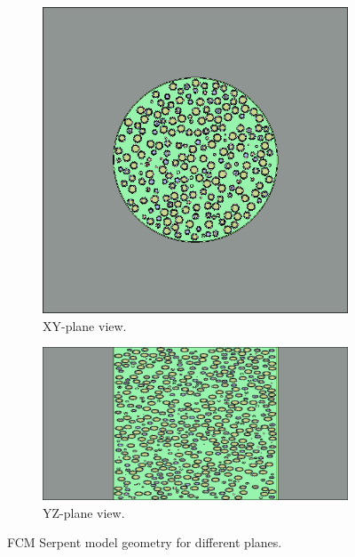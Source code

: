 \documentclass[11pt,letterpaper]{article}
\begin{document}
	\begin{figure}[htbp!]
		\centering
		\begin{subfigure}[t]{0.4\textwidth}
			\centering
			\includegraphics[width=\linewidth]{figures/FCM_geom1.png} 
			\caption{XY-plane view.}
			\label{fig:FCM_xy}
		\end{subfigure}
		\begin{subfigure}[t]{0.4\textwidth}
			\centering
			\includegraphics[width=\linewidth]{figures/FCM_geom2.png}
			\caption{YZ-plane view.}
			\label{fig:FCM_yz}
		\end{subfigure}
		\hfill
		\caption{FCM Serpent model geometry for different planes.}
		\label{fig:FCM}
	\end{figure}
\end{document}
